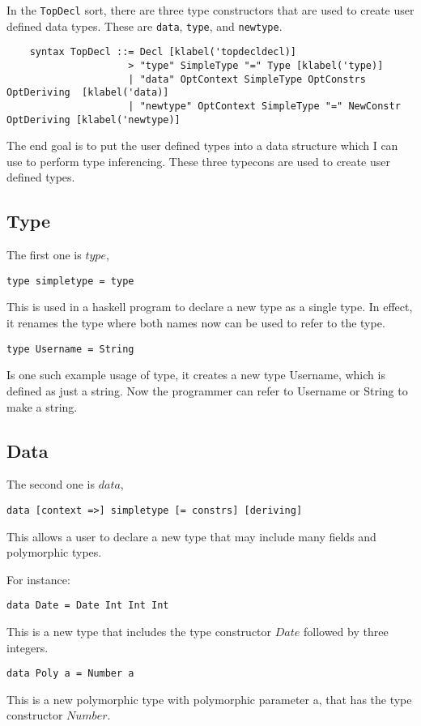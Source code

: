 In the \texttt{TopDecl} sort, there are three type constructors that are used to create user defined data types. These are \texttt{data}, \texttt{type}, and \texttt{newtype}.

\begin{lstlisting}
    syntax TopDecl ::= Decl [klabel('topdecldecl)]
                     > "type" SimpleType "=" Type [klabel('type)]
                     | "data" OptContext SimpleType OptConstrs OptDeriving  [klabel('data)]
                     | "newtype" OptContext SimpleType "=" NewConstr OptDeriving [klabel('newtype)]
\end{lstlisting}

The end goal is to put the user defined types into a data structure which I can use to perform type inferencing. These three typecons are used to create user defined types.

\subsection{Type}
The first one is $type$,
	\begin{lstlisting}
type simpletype = type 
	\end{lstlisting}
This is used in a haskell program to declare a new type as a single type. In effect, it renames the type where both names now can be used to refer to the type.
	\begin{lstlisting}
type Username = String
	\end{lstlisting}
Is one such example usage of type, it creates a new type Username, which is defined as just a string. Now the programmer can refer to Username or String to make a string.

\subsection{Data}
The second one is $data$,
\begin{lstlisting}
data [context =>] simpletype [= constrs] [deriving]
\end{lstlisting}
This allows a user to declare a new type that may include many fields and polymorphic types.

For instance:
\begin{lstlisting}
data Date = Date Int Int Int
\end{lstlisting}
This is a new type that includes the type constructor $Date$ followed by three integers.
\begin{lstlisting}
data Poly a = Number a
\end{lstlisting}
This is a new polymorphic type with polymorphic parameter a, that has the type constructor $Number$.

